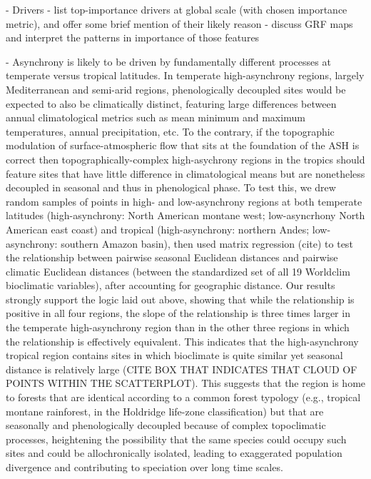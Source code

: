 \documentclass[12pt]{article}
\begin{document}
- Drivers
  - list top-importance drivers at global scale (with chosen importance metric), and offer some brief mention of their likely reason
  - discuss GRF maps and interpret the patterns in importance of those features

- Asynchrony is likely to be driven by fundamentally different processes at temperate versus tropical latitudes. In temperate high-asynchrony regions, largely Mediterranean and semi-arid regions, phenologically decoupled sites would be expected to also be climatically distinct, featuring large differences between annual climatological metrics such as mean minimum and maximum temperatures, annual precipitation, etc. To the contrary, if the topographic modulation of surface-atmospheric flow that sits at the foundation of the ASH is correct then topographically-complex high-asychrony regions in the tropics should feature sites that have little difference in climatological means but are nonetheless decoupled in seasonal and thus in phenological phase. To test this, we drew random samples of points in high- and low-asynchrony regions at both temperate latitudes (high-asynchrony: North American montane west; low-asyncrhony North American east coast) and tropical (high-asynchrony: northern Andes; low-asynchrony: southern Amazon basin), then used matrix regression (cite) to test the relationship between pairwise seasonal Euclidean distances and pairwise climatic Euclidean distances (between the standardized set of all 19 Worldclim bioclimatic variables), after accounting for geographic distance. Our results strongly support the logic laid out above, showing that while the relationship is positive in all four regions, the slope of the relationship is three times larger in the temperate high-asynchrony region than in the other three regions in which the relationship is effectively equivalent. This indicates that the high-asynchrony tropical region contains sites in which bioclimate is quite similar yet seasonal distance is relatively large (CITE BOX THAT INDICATES THAT CLOUD OF POINTS WITHIN THE SCATTERPLOT). This suggests that the region is home to forests that are identical according to a common forest typology (e.g., tropical montane rainforest, in the Holdridge life-zone classification) but that are seasonally and phenologically decoupled because of complex topoclimatic processes, heightening the possibility that the same species could occupy such sites and could be allochronically isolated, leading to exaggerated population divergence and contributing to speciation over long time scales.
\end{document}
